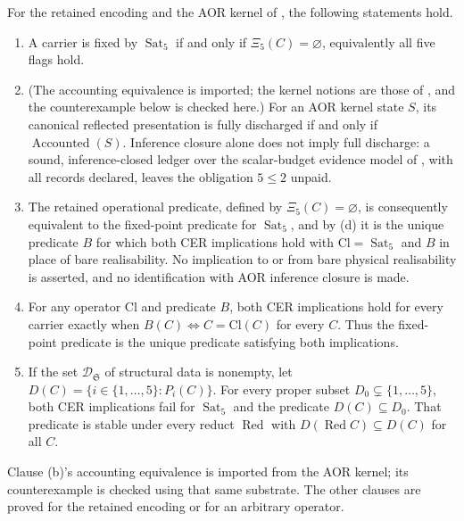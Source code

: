 \begin{proposition}\label{prop:F53}
For the retained encoding and the AOR kernel of
, the following statements hold.
\begin{enumerate}[label=(\alph*),topsep=2pt,itemsep=2pt]
\item A carrier is fixed by \(\operatorname{Sat}_5\) if and only if
  \(\Xi_5(C)=\varnothing\), equivalently all five flags hold.
\item (The accounting equivalence is imported; the kernel notions
  are those of \citet{Tsiokos2026AOR}, and the counterexample
  below is checked here.) For an AOR kernel state \(S\), its canonical reflected
  presentation is fully discharged if and only if
  \(\operatorname{Accounted}(S)\). Inference closure alone does not imply
  full discharge: a sound, inference-closed ledger over the scalar-budget
  evidence model of \PaperAOR, with all records declared, leaves the obligation \(5\le2\) unpaid.
\item The retained operational predicate, defined by
  \(\Xi_5(C)=\varnothing\), is consequently equivalent to the fixed-point
  predicate for \(\operatorname{Sat}_5\), and by (d) it is the unique
  predicate \(B\) for which both CER implications hold with
  \(\mathrm{Cl}=\operatorname{Sat}_5\) and \(B\) in place of bare
  realisability. No implication to or from bare
  physical realisability is asserted, and no identification with
  AOR inference closure is made.
\item For any operator \(\mathrm{Cl}\) and predicate \(B\), both CER
  implications hold for every carrier exactly when
  \(B(C)\iff C=\mathrm{Cl}(C)\) for every \(C\). Thus the fixed-point
  predicate is the unique predicate satisfying both implications.
\item If the set \(\mathcal D_{\mathfrak S}\) of structural data is nonempty, let
  \(D(C)=\{i\in\{1,\dots,5\}:P_i(C)\}\). For every proper subset
  \(D_0\subsetneq\{1,\dots,5\}\), both CER implications fail for
  \(\operatorname{Sat}_5\) and the predicate \(D(C)\subseteq D_0\). That
  predicate is stable under every reduct \(\operatorname{Red}\) with
  \(D(\operatorname{Red}C)\subseteq D(C)\) for all \(C\).
\end{enumerate}
Clause (b)'s accounting equivalence is imported from the AOR
kernel; its counterexample is checked using that same substrate. The other
clauses are proved for the retained encoding or for an arbitrary operator.
\end{proposition}
